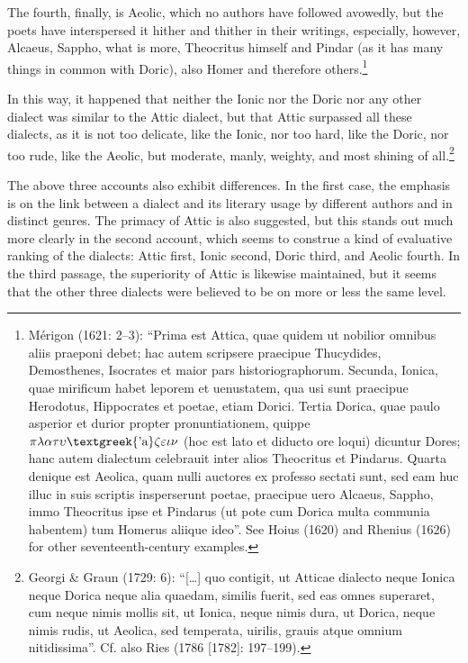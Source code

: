 \begin{styleQuote}
The fourth, finally, is Aeolic, which no authors have followed avowedly, but the poets have interspersed it hither and thither in their writings, especially, however, Alcaeus, Sappho, what is more, Theocritus himself and Pindar (as it has many things in common with Doric), also Homer and therefore others.\footnote{ Mérigon (1621: 2–3): “Prima est Attica, quae quidem ut nobilior omnibus aliis praeponi debet; hac autem scripsere praecipue Thucydides, Demosthenes, Isocrates et maior pars historiographorum. Secunda, Ionica, quae mirificum habet leporem et uenustatem, qua usi sunt praecipue Herodotus, Hippocrates et poetae, etiam Dorici. Tertia Dorica, quae paulo asperior et durior propter pronuntiationem, quippe $\pi \lambda \alpha \tau \upsilon \text{\textgreek{'a}}\zeta \varepsilon \iota \nu $ (hoc est lato et diducto ore loqui) dicuntur Dores; hanc autem dialectum celebrauit inter alios Theocritus et Pindarus. Quarta denique est Aeolica, quam nulli auctores ex professo sectati sunt, sed eam huc illuc in suis scriptis insperserunt poetae, praecipue uero Alcaeus, Sappho, immo Theocritus ipse et Pindarus (ut pote cum Dorica multa communia habentem) tum Homerus aliique ideo”. See Hoius (1620) and Rhenius (1626) for other seventeenth-century examples.}
\end{styleQuote}

\begin{styleQuote}
In this way, it happened that neither the Ionic nor the Doric nor any other dialect was similar to the Attic dialect, but that Attic surpassed all these dialects, as it is not too delicate, like the Ionic, nor too hard, like the Doric, nor too rude, like the Aeolic, but moderate, manly, weighty, and most shining of all.\footnote{ Georgi \& Graun (1729: 6): “[…] quo contigit, ut Atticae dialecto neque Ionica neque Dorica neque alia quaedam, similis fuerit, sed eas omnes superaret, cum neque nimis mollis sit, ut Ionica, neque nimis dura, ut Dorica, neque nimis rudis, ut Aeolica, sed temperata, uirilis, grauis atque omnium nitidissima”. Cf. also Ries (1786 [1782]: 197–199).}
\end{styleQuote}

\begin{styleStandard}
The above three accounts also exhibit differences. In the first case, the emphasis is on the link between a dialect and its literary usage by different authors and in distinct genres. The primacy of Attic is also suggested, but this stands out much more clearly in the second account, which seems to construe a kind of evaluative ranking of the dialects: Attic first, Ionic second, Doric third, and Aeolic fourth. In the third passage, the superiority of Attic is likewise maintained, but it seems that the other three dialects were believed to be on more or less the same level.
\end{styleStandard}

